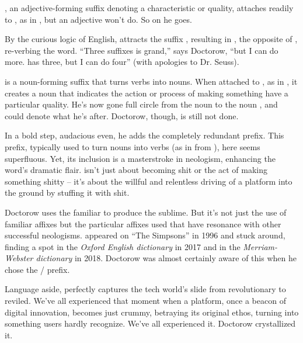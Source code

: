 , an adjective-forming suffix denoting a characteristic or quality, attaches readily to , as in , but an adjective won't do. So on he goes.

By the curious logic of English,  attracts the suffix , resulting in , the opposite of , re-verbing the word. ``Three suffixes is grand,'' says Doctorow, ``but I can do more.  has three, but I can do four'' (with apologies to Dr. Seuss).

 is a noun-forming suffix that turns verbs into nouns. When attached to , as in , it creates a noun that indicates the action or process of making something have a particular quality. He's now gone full circle from the noun  to the noun , and  could denote what he's after. Doctorow, though, is still not done.

In a bold step, audacious even, he adds the completely redundant  prefix. This prefix, typically used to turn nouns into verbs (as in  from ), here seems superfluous. Yet, its inclusion is a masterstroke in neologism, enhancing the word's dramatic flair.  isn't just about becoming shit or the act of making something shitty -- it's about the willful and relentless driving of a platform into the ground by stuffing it with shit.

Doctorow uses the familiar to produce the sublime. But it's not just the use of familiar affixes but the particular affixes used that have resonance with other successful neologisms.  appeared on ``The Simpsons'' in 1996 and stuck around, finding a spot in the \textit{Oxford English dictionary} in 2017 and in the \textit{Merriam-Webster dictionary} in 2018. Doctorow was almost certainly aware of this when he chose the / prefix.

Language aside,  perfectly captures the tech world's slide from revolutionary to reviled. We've all experienced that moment when a platform, once a beacon of digital innovation, becomes just crummy, betraying its original ethos, turning into something users hardly recognize. We've all experienced it. Doctorow crystallized it.

